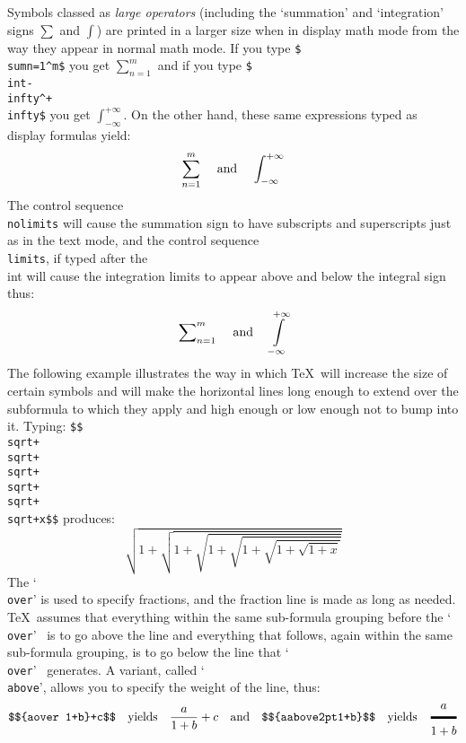 Symbols classed as {\sl large operators} (including the `summation'
and `integration' signs $\sum$ and $\int$)  are printed in a larger
size when in display math mode from the way they appear in normal math
mode.
If you type {\tt \$\\sum\und{}\lbr n=1\rbr\^{}m\$} you get $\sum_{n=1}^m$ and
if you type {\tt \$\\int\und{}\lbr -\\infty\rbr\^{}\lbr +\\infty\rbr\$}
 you get $\int_{-\infty}^{+\infty}$.  On the
other hand, these same expressions typed as display formulas yield:
$$\hbox
{{$\displaystyle\sum_{n=1}^m$} \quad
  and \quad {$\displaystyle\int_{-\infty}^{+\infty}$}}$$
The  control sequence {\tt \\nolimits} will cause the summation sign to have
subscripts and superscripts just as in the text mode, and the
control sequence {\tt \\limits}, if typed after the \\int will cause
the integration limits to appear above and below the integral sign thus:
$$\hbox
{{$\displaystyle\sum\nolimits_{n=1}^m$} \quad
  and \quad {$\displaystyle\int\limits_{-\infty}^{+\infty}$}}$$
The following example illustrates the way in which \TeX\ will increase
the size of certain symbols and will make the horizontal lines long enough
to extend over the subformula to which they apply and high enough or low
enough not to bump into it. Typing:
{\tt \$\$\\sqrt{}+\\sqrt{}+\\sqrt{}+%
\\sqrt{}+\\sqrt{}+\\sqrt{}+x\rbr\rbr\rbr\rbr\rbr\rbr\$\$} \quad produces:
$$\sqrt{1+\sqrt{1+\sqrt{1+\sqrt{1+\sqrt{1+\sqrt{1+x}}}}}}$$
The \cs\/ `{\tt \\over}' is used to specify fractions, and the fraction line
is made as long as needed. \TeX\ assumes that
everything within the same sub-formula grouping before the
`{\tt \\over}' \cs\/\ is to go above the
line and everything that follows,
 again within the same sub-formula grouping, is
to go below the line that `{\tt \\over}' \ generates.
A variant, called
`{\tt \\above}', allows you to specify the weight of the line, thus:\goodbreak
$$\hbox{{\tt \$\$\lbr a\\over 1+b\rbr+c\$\$}\quad yields\quad}
{a\over1+b}+c \hbox{\quad
and\quad {\tt \$\$\lbr a\\above2pt1+b\rbr\$\$}\quad yields\quad}{a\above2pt1+b}$$
